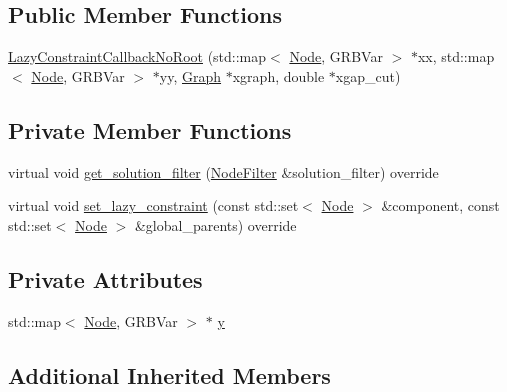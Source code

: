 \subsection*{Public Member Functions}
\begin{DoxyCompactItemize}
\item 
\hyperlink{classderegnet_1_1LazyConstraintCallbackNoRoot_abd4603bff30a09c920cdf67d8e5ba12f}{Lazy\+Constraint\+Callback\+No\+Root} (std\+::map$<$ \hyperlink{namespacederegnet_a744bad34f2de9856d36715a445f027f3}{Node}, G\+R\+B\+Var $>$ $\ast$xx, std\+::map$<$ \hyperlink{namespacederegnet_a744bad34f2de9856d36715a445f027f3}{Node}, G\+R\+B\+Var $>$ $\ast$yy, \hyperlink{namespacederegnet_a55b76c55bbabc682cbc61f8b9948799e}{Graph} $\ast$xgraph, double $\ast$xgap\+\_\+cut)
\end{DoxyCompactItemize}
\subsection*{Private Member Functions}
\begin{DoxyCompactItemize}
\item 
virtual void \hyperlink{classderegnet_1_1LazyConstraintCallbackNoRoot_a80686ee58b84bb1c73af6f7eddb50db6}{get\+\_\+solution\+\_\+filter} (\hyperlink{namespacederegnet_a50db1f8fc7c6a954d825d9e1ed9ad302}{Node\+Filter} \&solution\+\_\+filter) override
\item 
virtual void \hyperlink{classderegnet_1_1LazyConstraintCallbackNoRoot_a3703cd9ca73c46d70bb90f50bb2e66e5}{set\+\_\+lazy\+\_\+constraint} (const std\+::set$<$ \hyperlink{namespacederegnet_a744bad34f2de9856d36715a445f027f3}{Node} $>$ \&component, const std\+::set$<$ \hyperlink{namespacederegnet_a744bad34f2de9856d36715a445f027f3}{Node} $>$ \&global\+\_\+parents) override
\end{DoxyCompactItemize}
\subsection*{Private Attributes}
\begin{DoxyCompactItemize}
\item 
std\+::map$<$ \hyperlink{namespacederegnet_a744bad34f2de9856d36715a445f027f3}{Node}, G\+R\+B\+Var $>$ $\ast$ \hyperlink{classderegnet_1_1LazyConstraintCallbackNoRoot_aaa32cd3d5b65d1c41174cbc9a120ab64}{y}
\end{DoxyCompactItemize}
\subsection*{Additional Inherited Members}


